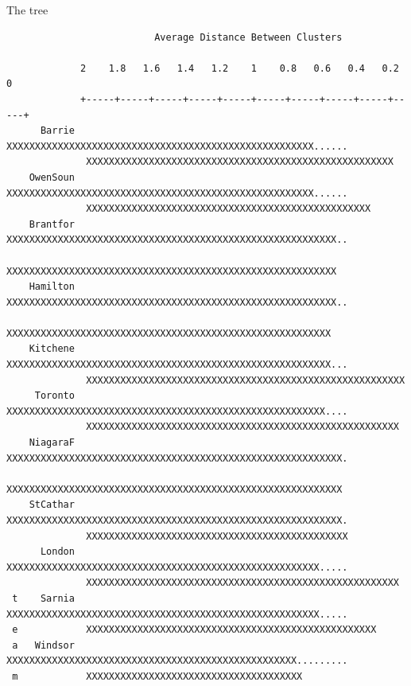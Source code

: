 \documentclass[pdf]{prosper}
\begin{document}
\begin{slide}{The tree}

{\tiny
\begin{verbatim}
                          Average Distance Between Clusters

             2    1.8   1.6   1.4   1.2    1    0.8   0.6   0.4   0.2    0
             +-----+-----+-----+-----+-----+-----+-----+-----+-----+-----+
      Barrie  XXXXXXXXXXXXXXXXXXXXXXXXXXXXXXXXXXXXXXXXXXXXXXXXXXXXXX......
              XXXXXXXXXXXXXXXXXXXXXXXXXXXXXXXXXXXXXXXXXXXXXXXXXXXXXX
    OwenSoun  XXXXXXXXXXXXXXXXXXXXXXXXXXXXXXXXXXXXXXXXXXXXXXXXXXXXXX......
              XXXXXXXXXXXXXXXXXXXXXXXXXXXXXXXXXXXXXXXXXXXXXXXXXX
    Brantfor  XXXXXXXXXXXXXXXXXXXXXXXXXXXXXXXXXXXXXXXXXXXXXXXXXXXXXXXXXX..
              XXXXXXXXXXXXXXXXXXXXXXXXXXXXXXXXXXXXXXXXXXXXXXXXXXXXXXXXXX
    Hamilton  XXXXXXXXXXXXXXXXXXXXXXXXXXXXXXXXXXXXXXXXXXXXXXXXXXXXXXXXXX..
              XXXXXXXXXXXXXXXXXXXXXXXXXXXXXXXXXXXXXXXXXXXXXXXXXXXXXXXXX
    Kitchene  XXXXXXXXXXXXXXXXXXXXXXXXXXXXXXXXXXXXXXXXXXXXXXXXXXXXXXXXX...
              XXXXXXXXXXXXXXXXXXXXXXXXXXXXXXXXXXXXXXXXXXXXXXXXXXXXXXXX
     Toronto  XXXXXXXXXXXXXXXXXXXXXXXXXXXXXXXXXXXXXXXXXXXXXXXXXXXXXXXX....
              XXXXXXXXXXXXXXXXXXXXXXXXXXXXXXXXXXXXXXXXXXXXXXXXXXXXXXX
    NiagaraF  XXXXXXXXXXXXXXXXXXXXXXXXXXXXXXXXXXXXXXXXXXXXXXXXXXXXXXXXXXX.
              XXXXXXXXXXXXXXXXXXXXXXXXXXXXXXXXXXXXXXXXXXXXXXXXXXXXXXXXXXX
    StCathar  XXXXXXXXXXXXXXXXXXXXXXXXXXXXXXXXXXXXXXXXXXXXXXXXXXXXXXXXXXX.
              XXXXXXXXXXXXXXXXXXXXXXXXXXXXXXXXXXXXXXXXXXXXXX
      London  XXXXXXXXXXXXXXXXXXXXXXXXXXXXXXXXXXXXXXXXXXXXXXXXXXXXXXX.....
              XXXXXXXXXXXXXXXXXXXXXXXXXXXXXXXXXXXXXXXXXXXXXXXXXXXXXXX
 t    Sarnia  XXXXXXXXXXXXXXXXXXXXXXXXXXXXXXXXXXXXXXXXXXXXXXXXXXXXXXX.....
 e            XXXXXXXXXXXXXXXXXXXXXXXXXXXXXXXXXXXXXXXXXXXXXXXXXXX
 a   Windsor  XXXXXXXXXXXXXXXXXXXXXXXXXXXXXXXXXXXXXXXXXXXXXXXXXXX.........
 m            XXXXXXXXXXXXXXXXXXXXXXXXXXXXXXXXXXXXXX
\end{verbatim}
}
\end{slide}
\end{document}
